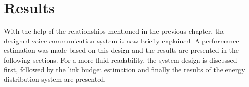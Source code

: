 \chapter{Results}
With the help of the relationships mentioned in the previous chapter, the designed voice communication system is now briefly explained. A performance estimation was made based on this design and the results are presented in the following sections. For a more fluid readability, the system design is discussed first, followed by the link budget estimation and finally the results of the energy distribution system are presented.  



